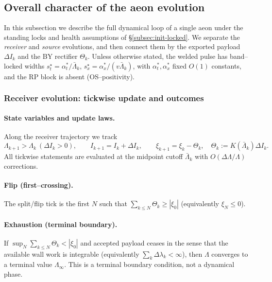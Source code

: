 \documentclass[10pt]{article}
\theoremstyle{definition}
\theoremstyle{plain}
\begin{document}
\subsection{Overall character of the aeon evolution}
\label{subsec:aeon-evolution}

In this subsection we describe the full dynamical loop of a single aeon under the standing locks and
health assumptions of \S\ref{subsec:init-locked}. We separate the \emph{receiver} and \emph{source}
evolutions, and then connect them by the exported payload $\Delta I_k$ and the BY rectifier $\Theta_k$.
Unless otherwise stated, the welded pulse has band–locked widths
$s_t^\star=\alpha_t^{*}/\bar\Lambda_k$, $s_x^\star=\alpha_x^{*}/(v\bar\Lambda_k)$, with $\alpha_t^{*},\alpha_x^{*}$ fixed
$O(1)$ constants, and the RP block is absent (OS–positivity).

\subsubsection*{Receiver evolution: tickwise update and outcomes}
\label{subsubsec:receiver-phases}

\paragraph{State variables and update laws.}\label{par:uom-main-138}
Along the receiver trajectory we track
\[
\Lambda_{k+1}>\Lambda_k\ (\Delta I_k>0),\qquad I_{k+1}=I_k+\Delta I_k,\qquad
\xi_{k+1}=\xi_k-\Theta_k,\quad \Theta_k:=K(\bar\Lambda_k)\Delta I_k.
\]
All tickwise statements are evaluated at the midpoint cutoff $\bar\Lambda_k$ with
$O(\Delta\Lambda/\Lambda)$ corrections.

\paragraph{Flip (first--crossing).}\label{par:uom-main-139}
The split/flip tick is the first $N$ such that
$\sum_{k\le N}\Theta_k\ge |\xi_0|$ (equivalently $\xi_N\le 0$).

\paragraph{Exhaustion (terminal boundary).}\label{par:uom-main-140}
If $\sup_N\sum_{k\le N}\Theta_k<|\xi_0|$ and accepted payload ceases in the sense that the
available wall work is integrable (equivalently $\sum_k\Delta\lambda_k<\infty$), then
$\Lambda$ converges to a terminal value $\Lambda_\infty$. This is a terminal boundary condition,
not a dynamical phase.
\end{document}

